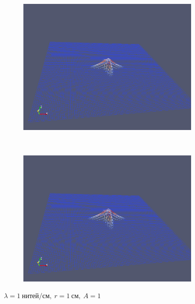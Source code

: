 \begin{figure}[H]
\begin{subfigure}[t]{0.5\textwidth}
        \includegraphics[width=\textwidth]{img/fiber/density_1_radius_1_amplitude_1/5.png}
    \end{subfigure}%
    ~
    \begin{subfigure}[t]{0.5\textwidth}
        \centering
        \includegraphics[width=\textwidth]{img/fiber/density_1_radius_1_amplitude_1/6.png}
    \end{subfigure}
    \caption{$\lambda=1~нитей/см,~r=1~см,~A=1$}
\end{figure}
